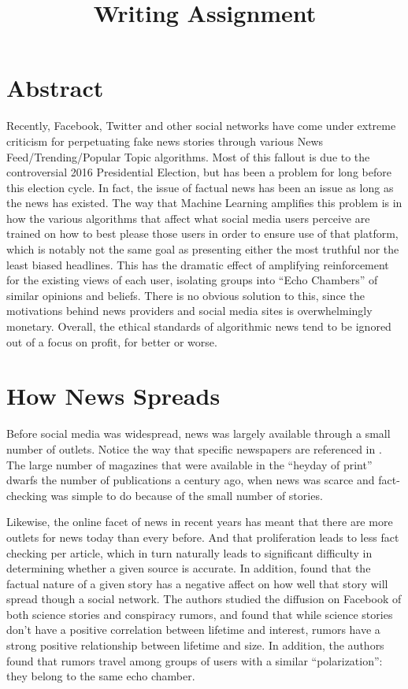 \documentclass{article}
\title{Writing Assignment}
\begin{document}
 

\section*{Abstract}
Recently, Facebook, Twitter and other social networks have come under extreme criticism for perpetuating fake news stories through various News Feed/Trending/Popular Topic algorithms. Most of this fallout is due to the controversial 2016 Presidential Election, but has been a problem for long before this election cycle. In fact, the issue of factual news has been an issue as long as the news has existed. The way that Machine Learning amplifies this problem is in how the various algorithms that affect what social media users perceive are trained on how to best please those users in order to ensure use of that platform, which is notably not the same goal as presenting either the most truthful nor the least biased headlines. This has the dramatic effect of amplifying reinforcement for the existing views of each user, isolating groups into ``Echo Chambers'' of similar opinions and beliefs. There is no obvious solution to this, since the motivations behind news providers and social media sites is overwhelmingly monetary. Overall, the ethical standards of algorithmic news tend to be ignored out of a focus on profit, for better or worse. 

\section*{How News Spreads}
Before social media was widespread, news was largely available through a small number of outlets. Notice the way that specific newspapers are referenced in \citet{barber_newspaper_2001}. The large number of magazines that were available in the ``heyday of print'' dwarfs the number of publications a century ago, when news was scarce and fact-checking was simple to do because of the small number of stories. \cite{eadie_21st_2009}

Likewise, the online facet of news in recent years has meant that there are more outlets for news today than every before. And that proliferation leads to less fact checking per article, which in turn naturally leads to significant difficulty in determining whether a given source is accurate. \cite{bbc_quiz:_2016,johnson_us_2016} In addition, \citet{del_vicario_spreading_2016} found that the factual nature of a given story has a negative affect on how well that story will spread though a social network. The authors studied the diffusion on Facebook of both science stories and conspiracy rumors, and found that while science stories don't have a positive correlation between lifetime and interest, rumors have a strong positive relationship between lifetime and size. In addition, the authors found that rumors travel among groups of users with a similar ``polarization'': they belong to the same echo chamber. 
\end{document}

